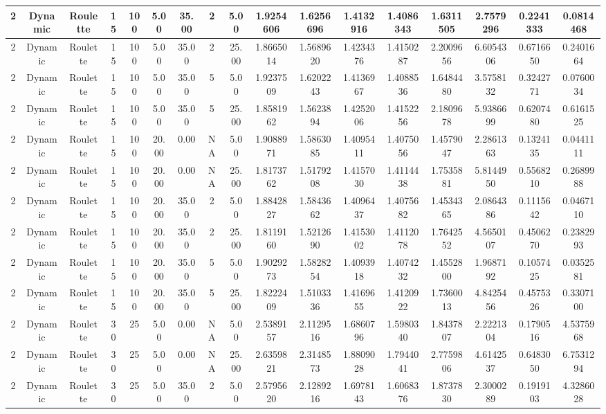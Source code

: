 \begin{longtable}{ | c | c | c | c | c | c | c | c | c | c | c | c | c | c | c | c | c | }
	\hline
	2	&	Dynamic	&	Roulette	&	15	&	100	&	5.00	&	35.00	&	2	&	5.00	&	1.9254606	&	1.6256696	&	1.4132916	&	1.4086343	&	1.6311505	&	2.7579296	&	0.2241333	&	0.0814468 \\
	\hline
	2	&	Dynamic	&	Roulette	&	15	&	100	&	5.00	&	35.00	&	2	&	25.00	&	1.8665014	&	1.5689620	&	1.4234376	&	1.4150287	&	2.2009656	&	6.6054306	&	0.6716650	&	0.2401664 \\
	\hline
	2	&	Dynamic	&	Roulette	&	15	&	100	&	5.00	&	35.00	&	5	&	5.00	&	1.9237509	&	1.6202243	&	1.4136967	&	1.4088536	&	1.6484480	&	3.5758132	&	0.3242771	&	0.0760034 \\
	\hline
	2	&	Dynamic	&	Roulette	&	15	&	100	&	5.00	&	35.00	&	5	&	25.00	&	1.8581962	&	1.5623894	&	1.4252006	&	1.4152256	&	2.1809678	&	5.9386699	&	0.6207480	&	0.6161525 \\
	\hline
	2	&	Dynamic	&	Roulette	&	15	&	100	&	20.00	&	0.00	&	NA	&	5.00	&	1.9088971	&	1.5863085	&	1.4095411	&	1.4075056	&	1.4579047	&	2.2861363	&	0.1324135	&	0.0441111 \\
	\hline
	2	&	Dynamic	&	Roulette	&	15	&	100	&	20.00	&	0.00	&	NA	&	25.00	&	1.8173762	&	1.5179208	&	1.4157030	&	1.4114438	&	1.7535881	&	5.8144950	&	0.5568210	&	0.2689988 \\
	\hline
	2	&	Dynamic	&	Roulette	&	15	&	100	&	20.00	&	35.00	&	2	&	5.00	&	1.8842827	&	1.5843662	&	1.4096437	&	1.4075682	&	1.4534365	&	2.0864386	&	0.1115642	&	0.0467110 \\
	\hline
	2	&	Dynamic	&	Roulette	&	15	&	100	&	20.00	&	35.00	&	2	&	25.00	&	1.8119160	&	1.5212690	&	1.4153002	&	1.4112078	&	1.7642552	&	4.5650107	&	0.4506270	&	0.2382993 \\
	\hline
	2	&	Dynamic	&	Roulette	&	15	&	100	&	20.00	&	35.00	&	5	&	5.00	&	1.9029273	&	1.5828254	&	1.4093918	&	1.4074232	&	1.4552800	&	1.9687192	&	0.1057425	&	0.0352581 \\
	\hline
	2	&	Dynamic	&	Roulette	&	15	&	100	&	20.00	&	35.00	&	5	&	25.00	&	1.8222409	&	1.5103336	&	1.4169655	&	1.4120922	&	1.7360013	&	4.8425456	&	0.4575326	&	0.3307100 \\
	\hline
	2	&	Dynamic	&	Roulette	&	30	&	25	&	5.00	&	0.00	&	NA	&	5.00	&	2.5389157	&	2.1129516	&	1.6860796	&	1.5980340	&	1.8437807	&	2.2221304	&	0.1790516	&	4.5375968 \\
	\hline
	2	&	Dynamic	&	Roulette	&	30	&	25	&	5.00	&	0.00	&	NA	&	25.00	&	2.6359821	&	2.3148573	&	1.8809028	&	1.7944041	&	2.7759806	&	4.6142537	&	0.6483050	&	6.7531294 \\
	\hline
	2	&	Dynamic	&	Roulette	&	30	&	25	&	5.00	&	35.00	&	2	&	5.00	&	2.5795620	&	2.1289216	&	1.6978143	&	1.6068376	&	1.8737830	&	2.3000289	&	0.1919103	&	4.3286028 \\

\end{longtable}
